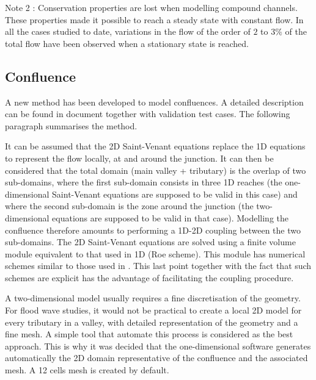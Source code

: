 \begin{CommentBlock}{Note 2 :}
Conservation properties are lost when modelling compound channels. These properties made it possible to reach a steady state with constant flow. In all the cases studied to date, variations in the flow of the order of $2$ to $3\%$ of the total flow have been observed when a stationary state is reached.
\end{CommentBlock}

\subsection{Confluence}

A new method has been developed to model confluences. A detailed description can be found in document \cite{MAUREL96} together with validation test cases. The following paragraph summarises the method.

It can be assumed that the 2D Saint-Venant equations replace the 1D equations to represent the flow locally, at and around the junction. It can then be considered that the total domain (main valley + tributary) is the overlap of two sub-domains, where the first sub-domain consists in three 1D reaches (the one-dimensional Saint-Venant equations are supposed to be valid in this case) and where the second sub-domain is the zone around the junction (the two-dimensional equations are supposed to be valid in that case). Modelling the confluence therefore amounts to performing a 1D-2D coupling between the two sub-domains. The 2D Saint-Venant equations are solved using a finite volume module equivalent to that used in 1D (Roe scheme). This module has numerical schemes similar to those used in \mascaret{}. This last point together with the fact that such schemes are explicit has the advantage of facilitating the coupling procedure.

A two-dimensional model usually requires a fine discretisation of the geometry. For flood wave studies, it would not be practical to create a local 2D model for every tributary in a valley, with detailed representation of the geometry and a fine mesh. A simple tool that automate this process is considered as the best approach.
This is why it was decided that the one-dimensional software generates automatically the 2D domain representative of the confluence and the associated mesh. A 12 cells mesh is created by default.

